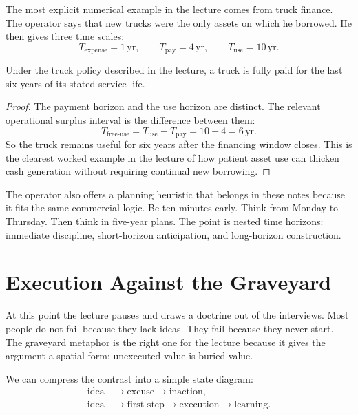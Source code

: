 The most explicit numerical example in the lecture comes from truck finance. The operator says that new trucks were the only assets on which he borrowed. He then gives three time scales:
\begin{equation}
T_{\text{expense}}=1\,\mathrm{yr},\qquad
T_{\text{pay}}=4\,\mathrm{yr},\qquad
T_{\text{use}}=10\,\mathrm{yr}.
\end{equation}

\begin{proposition}
Under the truck policy described in the lecture, a truck is fully paid for the last six years of its stated service life.
\end{proposition}

\begin{proof}
The payment horizon and the use horizon are distinct. The relevant operational surplus interval is the difference between them:
\begin{equation}
T_{\text{free-use}}=T_{\text{use}}-T_{\text{pay}}=10-4=6\,\mathrm{yr}.
\end{equation}
So the truck remains useful for six years after the financing window closes. This is the clearest worked example in the lecture of how patient asset use can thicken cash generation without requiring continual new borrowing.
\end{proof}

The operator also offers a planning heuristic that belongs in these notes because it fits the same commercial logic. Be ten minutes early. Think from Monday to Thursday. Then think in five-year plans. The point is nested time horizons: immediate discipline, short-horizon anticipation, and long-horizon construction.

\section{Execution Against the Graveyard}

At this point the lecture pauses and draws a doctrine out of the interviews. Most people do not fail because they lack ideas. They fail because they never start. The graveyard metaphor is the right one for the lecture because it gives the argument a spatial form: unexecuted value is buried value.

We can compress the contrast into a simple state diagram:
\begin{align}
\text{idea} &\to \text{excuse} \to \text{inaction},\\
\text{idea} &\to \text{first step} \to \text{execution} \to \text{learning}.
\end{align}


